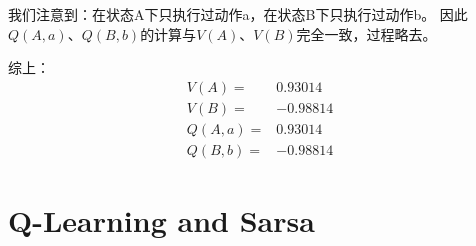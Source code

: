 \documentclass[12pt, a4paper]{article}
\begin{document}
\begin{enumerate}
        我们注意到：在状态A下只执行过动作a，在状态B下只执行过动作b。
        因此$Q(A, a)$、$Q(B, b)$的计算与$V(A)$、$V(B)$完全一致，过程略去。

        综上：
        \begin{align*}
        V(A) =& 0.93014 \\
        V(B) =& -0.98814 \\
        Q(A, a) =& 0.93014 \\
        Q(B, b) =& -0.98814
        \end{align*}

    \end{enumerate}

\section{Q-Learning and Sarsa}
\end{document}
